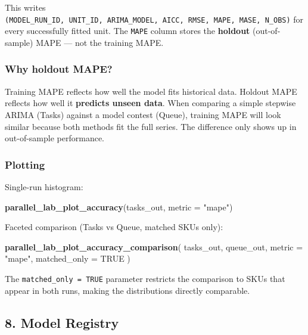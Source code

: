 \documentclass[
]{article}
\newenvironment{Shaded}{\begin{snugshade}}{\end{snugshade}}
\newcommand{\AttributeTok}[1]{\textcolor[rgb]{0.13,0.29,0.53}{#1}}
\newcommand{\ConstantTok}[1]{\textcolor[rgb]{0.56,0.35,0.01}{#1}}
\newcommand{\FunctionTok}[1]{\textcolor[rgb]{0.13,0.29,0.53}{\textbf{#1}}}
\newcommand{\NormalTok}[1]{#1}
\newcommand{\StringTok}[1]{\textcolor[rgb]{0.31,0.60,0.02}{#1}}
\begin{document}
This writes
\texttt{(MODEL\_RUN\_ID,\ UNIT\_ID,\ ARIMA\_MODEL,\ AICC,\ RMSE,\ MAPE,\ MASE,\ N\_OBS)}
for every successfully fitted unit. The \texttt{MAPE} column stores the
\textbf{holdout} (out-of-sample) MAPE --- not the training MAPE.

\subsubsection{Why holdout MAPE?}\label{why-holdout-mape}

Training MAPE reflects how well the model fits historical data. Holdout
MAPE reflects how well it \textbf{predicts unseen data}. When comparing
a simple stepwise ARIMA (Tasks) against a model contest (Queue),
training MAPE will look similar because both methods fit the full
series. The difference only shows up in out-of-sample performance.

\subsubsection{Plotting}\label{plotting}

Single-run histogram:

\begin{Shaded}
\begin{Highlighting}[]
\FunctionTok{parallel\_lab\_plot\_accuracy}\NormalTok{(tasks\_out, }\AttributeTok{metric =} \StringTok{"mape"}\NormalTok{)}
\end{Highlighting}
\end{Shaded}

Faceted comparison (Tasks vs Queue, matched SKUs only):

\begin{Shaded}
\begin{Highlighting}[]
\FunctionTok{parallel\_lab\_plot\_accuracy\_comparison}\NormalTok{(}
\NormalTok{  tasks\_out, queue\_out,}
  \AttributeTok{metric =} \StringTok{"mape"}\NormalTok{,}
  \AttributeTok{matched\_only =} \ConstantTok{TRUE}
\NormalTok{)}
\end{Highlighting}
\end{Shaded}

The \texttt{matched\_only\ =\ TRUE} parameter restricts the comparison
to SKUs that appear in both runs, making the distributions directly
comparable.

\subsection{8. Model Registry}\label{model-registry}
\end{document}
